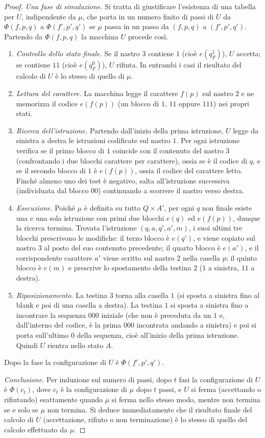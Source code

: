\begin{proof}
\medskip
\noindent\emph{Una fase di simulazione.} Si tratta di giustificare l'esistenza di una tabella per $U$, indipendente da $\mu$, che porta in un numero finito di passi di $U$ da $\Phi(f,p,q)$ a $\Phi(f',p',q')$ se $\mu$ passa in un passo da $(f,p,q)$ a $(f',p',q')$. Partendo da $\Phi(f,p,q)$ la macchina $U$ procede così.
\begin{enumerate}
\item \emph{Controllo dello stato finale.} Se il nastro $3$ contiene $1$ (cioè $e(q_F^1)$), $U$ accetta; se contiene $11$ (cioè $e(q_F^0)$), $U$ rifiuta. In entrambi i casi il risultato del calcolo di $U$ è lo stesso di quello di $\mu$.
\item \emph{Lettura del carattere.} La macchina legge il carattere $f(p)$ sul nastro $2$ e ne memorizza il codice $e(f(p))$ (un blocco di $1$, $11$ oppure $111$) nei propri stati.
\item \emph{Ricerca dell'istruzione.} Partendo dall'inizio della prima istruzione, $U$ legge da sinistra a destra le istruzioni codificate sul nastro $1$. Per ogni istruzione verifica se il primo blocco di $1$ coincide con il contenuto del nastro $3$ (confrontando i due blocchi carattere per carattere), ossia se è il codice di $q$, e se il secondo blocco di $1$ è $e(f(p))$, ossia il codice del carattere letto. Finché almeno uno dei test è negativo, salta all'istruzione successiva (individuata dal blocco $00$) continuando a scorrere il nastro verso destra.
\item \emph{Esecuzione.} Poiché $\mu$ è definita su tutto $Q\times A'$, per ogni $q$ non finale esiste una e una sola istruzione con primi due blocchi $e(q)$ ed $e(f(p))$, dunque la ricerca termina. Trovata l'istruzione $(q,a,q',a',m)$, i suoi ultimi tre blocchi prescrivono le modifiche: il terzo blocco è $e(q')$, e viene copiato sul nastro $3$ al posto del suo contenuto precedente; il quarto blocco è $e(a')$, e il corrispondente carattere $a'$ viene scritto sul nastro $2$ nella casella $p$; il quinto blocco è $e(m)$ e prescrive lo spostamento della testina $2$ ($1$ a sinistra, $11$ a destra).
\item \emph{Riposizionamento.} La testina $3$ torna alla casella $1$ (si sposta a sinistra fino al blank e poi di una casella a destra). La testina $1$ si sposta a sinistra fino a incontrare la sequenza $000$ iniziale (che non è preceduta da un $1$ e, dall'interno del codice, è la prima $000$ incontrata andando a sinistra) e poi si porta sull'ultimo $0$ della sequenza, cioè all'inizio della prima istruzione. Quindi $U$ rientra nello stato $A$.
\end{enumerate}
Dopo la fase la configurazione di $U$ è $\Phi(f',p',q')$.

\medskip
\noindent\emph{Conclusione.} Per induzione sul numero di passi, dopo $t$ fasi la configurazione di $U$ è $\Phi(c_t)$, dove $c_t$ è la configurazione di $\mu$ dopo $t$ passi, e $U$ si ferma (accettando o rifiutando) esattamente quando $\mu$ si ferma nello stesso modo, mentre non termina se e solo se $\mu$ non termina. Si deduce immediatamente che il risultato finale del calcolo di $U$ (accettazione, rifiuto o non terminazione) è lo stesso di quello del calcolo effettuato da $\mu$.
\end{proof}

